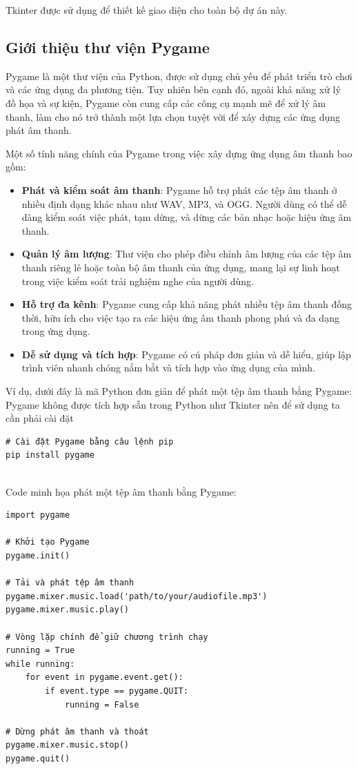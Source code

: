 \documentclass[a4paper]{article}
\begin{document}
Tkinter được sử dụng để thiết kế giao diện cho toàn bộ dự án này.

\subsection{Giới thiệu thư viện Pygame}

Pygame là một thư viện của Python, được sử dụng chủ yếu để phát triển trò chơi và các ứng dụng đa phương tiện. Tuy nhiên bên cạnh đó, ngoài khả năng xử lý đồ họa và sự kiện, Pygame còn cung cấp các công cụ mạnh mẽ để xử lý âm thanh, làm cho nó trở thành một lựa chọn tuyệt vời để xây dựng các ứng dụng phát âm thanh.

Một số tính năng chính của Pygame trong việc xây dựng ứng dụng âm thanh bao gồm:

\begin{itemize}
    \item \textbf{Phát và kiểm soát âm thanh}: Pygame hỗ trợ phát các tệp âm thanh ở nhiều định dạng khác nhau như WAV, MP3, và OGG. Người dùng có thể dễ dàng kiểm soát việc phát, tạm dừng, và dừng các bản nhạc hoặc hiệu ứng âm thanh.
    \item \textbf{Quản lý âm lượng}: Thư viện cho phép điều chỉnh âm lượng của các tệp âm thanh riêng lẻ hoặc toàn bộ âm thanh của ứng dụng, mang lại sự linh hoạt trong việc kiểm soát trải nghiệm nghe của người dùng.
    \item \textbf{Hỗ trợ đa kênh}: Pygame cung cấp khả năng phát nhiều tệp âm thanh đồng thời, hữu ích cho việc tạo ra các hiệu ứng âm thanh phong phú và đa dạng trong ứng dụng.
    \item \textbf{Dễ sử dụng và tích hợp}: Pygame có cú pháp đơn giản và dễ hiểu, giúp lập trình viên nhanh chóng nắm bắt và tích hợp vào ứng dụng của mình.
\end{itemize}

Ví dụ, dưới đây là mã Python đơn giản để phát một tệp âm thanh bằng Pygame: \\

Pygame không được tích hợp sẵn trong Python như Tkinter nên để sử dụng ta cần phải cài đặt
\begin{verbatim}
# Cài đặt Pygame bằng câu lệnh pip
pip install pygame
\end{verbatim}
\\
Code minh họa phát một tệp âm thanh bằng Pygame:
\begin{verbatim}
import pygame

# Khởi tạo Pygame
pygame.init()

# Tải và phát tệp âm thanh
pygame.mixer.music.load('path/to/your/audiofile.mp3')
pygame.mixer.music.play()

# Vòng lặp chính để giữ chương trình chạy
running = True
while running:
    for event in pygame.event.get():
        if event.type == pygame.QUIT:
            running = False

# Dừng phát âm thanh và thoát
pygame.mixer.music.stop()
pygame.quit()
\end{verbatim}
\end{document}
